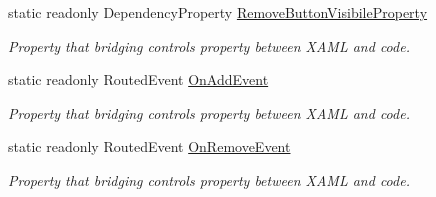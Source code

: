 \begin{DoxyCompactItemize}
static readonly Dependency\+Property \mbox{\hyperlink{class_wpf_handler_1_1_u_i_1_1_controls_1_1_auto_collection_a85a427be17693babbaa5943c04c2ca2d}{Remove\+Button\+Visibile\+Property}}
\begin{DoxyCompactList}\small\item\em Property that bridging control\textquotesingle{}s property between X\+A\+ML and code. \end{DoxyCompactList}\item 
static readonly Routed\+Event \mbox{\hyperlink{class_wpf_handler_1_1_u_i_1_1_controls_1_1_auto_collection_adb3a377a24d9b0fefc0d58cf0c8e6289}{On\+Add\+Event}}
\begin{DoxyCompactList}\small\item\em Property that bridging control\textquotesingle{}s property between X\+A\+ML and code. \end{DoxyCompactList}\item 
static readonly Routed\+Event \mbox{\hyperlink{class_wpf_handler_1_1_u_i_1_1_controls_1_1_auto_collection_a55213a701b1defa4c6a490d25f083fe4}{On\+Remove\+Event}}
\begin{DoxyCompactList}\small\item\em Property that bridging control\textquotesingle{}s property between X\+A\+ML and code. \end{DoxyCompactList}\end{DoxyCompactItemize}
